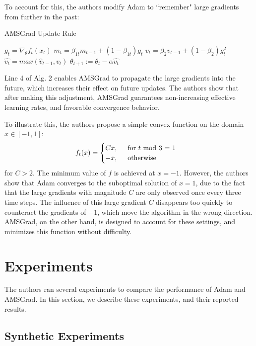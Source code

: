 \documentclass[letterpaper, 10 pt, conference]{ieeeconf}  %
\begin{document}
To account for this, the authors modify Adam to ``remember" large gradients from further in the past:

\begin{algorithm}
\caption{AMSGrad Update Rule}\label{Adam-update}
\begin{algorithmic}[1]
\State $g_t = \nabla_{\theta}f_t(x_t)$
\State $m_t = \beta_{1t}m_{t-1} + (1 - \beta_{1t})g_t$ 
\State $v_t = \beta_2{v_{t-1}} + (1-\beta_2)g_t^2$
\State $\hat{v_t} = max(\hat{v}_{t-1}, v_t)$
\State $\theta_{t + 1} := \theta_t - \alpha{\hat{v_t}}$
\end{algorithmic}
\end{algorithm}

Line 4 of Alg. 2 enables AMSGrad to propagate the large gradients into the future, which increases their effect on future updates. The authors show that after making this adjustment, AMSGrad guarantees non-increasing effective learning rates, and favorable convergence behavior.

To illustrate this, the authors propose a simple convex function on the domain $x \in [-1,1]$:
\[
    f_{t}(x) = 
    \begin{cases}
     	Cx, \hspace{5mm} \text{for } t \text{ mod 3 = 1} \\
        -x, \hspace{5mm} \text{otherwise}
    \end{cases}
\]
for $C>2$. The minimum value of $f$ is achieved at $x=-1$. However, the authors show that Adam converges to the suboptimal solution of $x = 1$, due to the fact that the large gradients with magnitude $C$ are only observed once every three time steps. The influence of this large gradient $C$ disappears too quickly to counteract the gradients of $-1$, which move the algorithm in the wrong direction. AMSGrad, on the other hand, is designed to account for these settings, and minimizes this function without difficulty.

\section{Experiments}


The authors ran several experiments to compare the performance of Adam and AMSGrad. In this section, we 
describe these experiments, and their reported results. 

\subsection{Synthetic Experiments}
\end{document}
